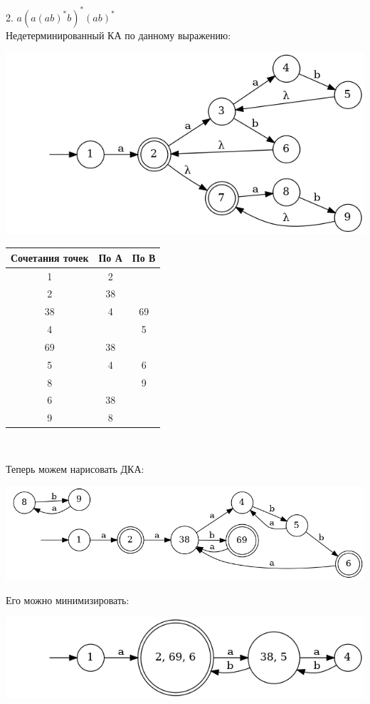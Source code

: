 \documentclass{article}
\begin{document}
    2. $a(a(ab)^*b)^*(ab)^*$\\
    Недетерминированный КА по данному выражению:
    \begin{center}
        \includegraphics[width=1\textwidth]{pic3_2_1.dot}\\
    \end{center}
    \begin{center}
        \begin{tabular}{|c|c|c|}
            \hline
            Сочетания точек & По А & По В \\
            \hline
                1 & 2 & \\
                2 & 38 & \\
                38 & 4 & 69 \\
                4 &  & 5 \\
                69 & 38 & \\
                5 & 4 & 6 \\
                8 & & 9 \\
                6 & 38 & \\
                9 & 8 & \\
            \hline
        \end{tabular}\\
    \end{center}
    Теперь можем нарисовать ДКА:
    \begin{center}
        \includegraphics[width=1\textwidth]{pic3_2_2.dot}\\
    \end{center}
    Его можно минимизировать:
    \begin{center}
        \includegraphics[width=1\textwidth]{pic3_2_3.dot}\\
    \end{center}
    
\end{document}
